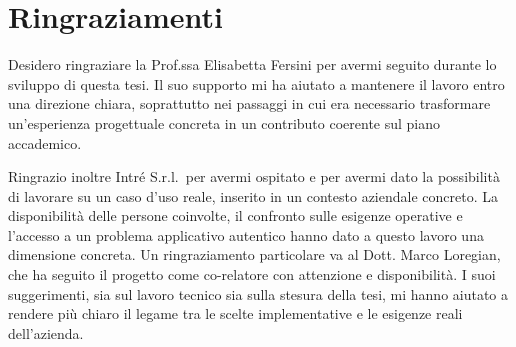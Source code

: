 \chapter*{Ringraziamenti}

Desidero ringraziare la Prof.ssa Elisabetta Fersini per avermi seguito durante
lo sviluppo di questa tesi. Il suo supporto mi ha aiutato a mantenere il lavoro
entro una direzione chiara, soprattutto nei passaggi in cui era necessario
trasformare un'esperienza progettuale concreta in un contributo coerente sul
piano accademico.

Ringrazio inoltre Intré S.r.l.\ per avermi ospitato e per avermi dato la
possibilità di lavorare su un caso d'uso reale, inserito in un contesto
aziendale concreto. La disponibilità delle persone coinvolte, il confronto sulle
esigenze operative e l'accesso a un problema applicativo autentico hanno dato a
questo lavoro una dimensione concreta. Un ringraziamento particolare va al
Dott. Marco Loregian, che ha seguito il progetto come co-relatore con attenzione
e disponibilità. I suoi suggerimenti, sia sul lavoro tecnico sia sulla stesura
della tesi, mi hanno aiutato a rendere più chiaro il legame tra le scelte
implementative e le esigenze reali dell'azienda.
